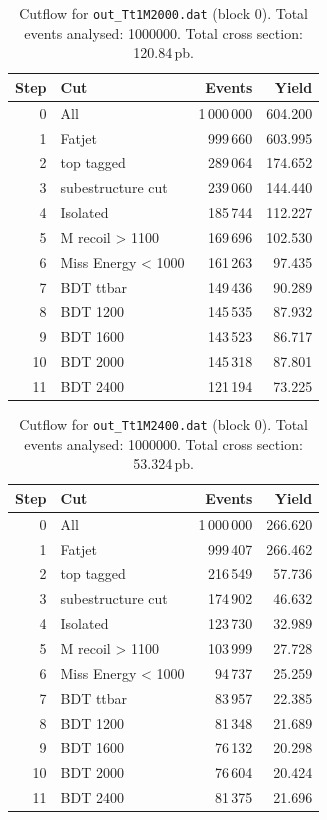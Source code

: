 \documentclass{article}
\begin{document}
\begin{table}[H]
\centering
\begin{tabular}{r l r r}
\toprule
Step & Cut & Events & Yield \\
\midrule
0 & All & 1\,000\,000 & 604.200 \\
1 & Fatjet & 999\,660 & 603.995 \\
2 & top tagged & 289\,064 & 174.652 \\
3 & subestructure cut & 239\,060 & 144.440 \\
4 & Isolated & 185\,744 & 112.227 \\
5 & M recoil > 1100 & 169\,696 & 102.530 \\
6 & Miss Energy < 1000 & 161\,263 & 97.435 \\
7 & BDT ttbar & 149\,436 & 90.289 \\
8 & BDT 1200 & 145\,535 & 87.932 \\
9 & BDT 1600 & 143\,523 & 86.717 \\
10 & BDT 2000 & 145\,318 & 87.801 \\
11 & BDT 2400 & 121\,194 & 73.225 \\
\bottomrule
\end{tabular}
\caption{Cutflow for \texttt{out\_Tt1M2000.dat} (block 0). Total events analysed: 1000000. Total cross section: 120.84\,pb.}
\label{tab:cutflow-out-Tt1M2000-dat}
\end{table}

\begin{table}[H]
\centering
\begin{tabular}{r l r r}
\toprule
Step & Cut & Events & Yield \\
\midrule
0 & All & 1\,000\,000 & 266.620 \\
1 & Fatjet & 999\,407 & 266.462 \\
2 & top tagged & 216\,549 & 57.736 \\
3 & subestructure cut & 174\,902 & 46.632 \\
4 & Isolated & 123\,730 & 32.989 \\
5 & M recoil > 1100 & 103\,999 & 27.728 \\
6 & Miss Energy < 1000 & 94\,737 & 25.259 \\
7 & BDT ttbar & 83\,957 & 22.385 \\
8 & BDT 1200 & 81\,348 & 21.689 \\
9 & BDT 1600 & 76\,132 & 20.298 \\
10 & BDT 2000 & 76\,604 & 20.424 \\
11 & BDT 2400 & 81\,375 & 21.696 \\
\bottomrule
\end{tabular}
\caption{Cutflow for \texttt{out\_Tt1M2400.dat} (block 0). Total events analysed: 1000000. Total cross section: 53.324\,pb.}
\label{tab:cutflow-out-Tt1M2400-dat}
\end{table}
\end{document}
